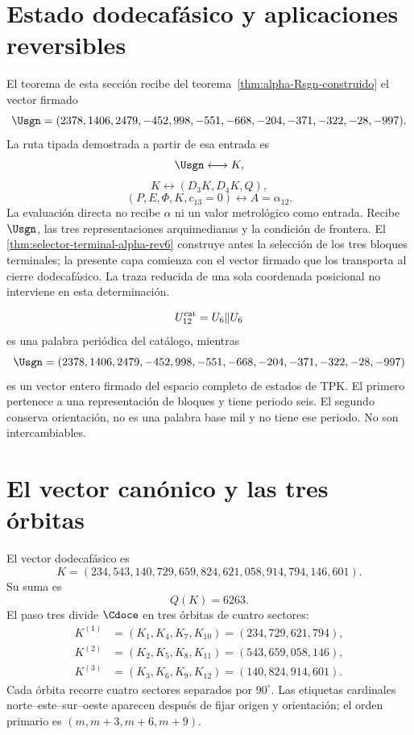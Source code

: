 \section{Estado dodecafásico y aplicaciones reversibles}

El teorema de esta sección recibe del
teorema~\ref{thm:alpha-Rsgn-construido} el vector firmado
\[
\Usgn=(2378,1406,2479,-452,998,-551,-668,-204,-371,-322,-28,-997).
\]
La ruta tipada demostrada a partir de esa entrada es
\[
\Usgn\longleftrightarrow K,
\]
\[
K\longleftrightarrow(D_3K,D_4K,Q),
\]
\[
(P,E,\Phi,K,c_{13}=0)
\longleftrightarrow A=\alpha_{12}.
\]
La evaluación directa no recibe \(\alpha\) ni un valor metrológico como
entrada. Recibe \(\Usgn\), las tres representaciones arquimedianas y la
condición de frontera. El
\cref{thm:selector-terminal-alpha-rev6} construye antes la selección de los
tres bloques terminales; la presente capa comienza con el vector firmado que
los transporta al cierre dodecafásico. La traza reducida de una sola
coordenada posicional no interviene en esta determinación.

\begin{remark}
\[
U_{12}^{\rm cat}=U_6\Vert U_6
\]
es una palabra periódica del catálogo, mientras
\[
\Usgn=(2378,1406,2479,-452,998,-551,-668,-204,-371,-322,-28,-997)
\]
es un vector entero firmado del espacio completo de estados de TPK\@. El primero pertenece a una
representación de bloques y tiene periodo seis. El segundo conserva orientación, no es
una palabra base mil y no tiene ese periodo. No son intercambiables.
\end{remark}

\section{El vector canónico y las tres órbitas}

El vector dodecafásico es
\[
\boxed{
K=(234,543,140,729,659,824,621,058,914,794,146,601).}
\]
Su suma es
\[
Q(K)=6263.
\]
El paso tres divide \(\Cdoce\) en tres órbitas de cuatro sectores:
\[
\begin{aligned}
K^{(1)}&=(K_1,K_4,K_7,K_{10})=(234,729,621,794),\\
K^{(2)}&=(K_2,K_5,K_8,K_{11})=(543,659,058,146),\\
K^{(3)}&=(K_3,K_6,K_9,K_{12})=(140,824,914,601).
\end{aligned}
\]
Cada órbita recorre cuatro sectores separados por \(90^\circ\). Las etiquetas
cardinales norte--este--sur--oeste aparecen después de fijar origen y orientación; el orden
primario es \((m,m+3,m+6,m+9)\).

